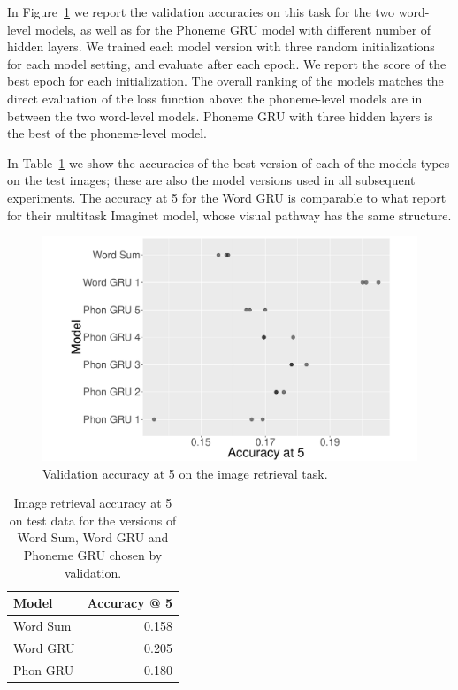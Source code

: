 In Figure~\ref{fig:accat5} we report the validation accuracies on this
task for the two word-level models, as well as for the Phoneme GRU
model with different number of hidden layers. We trained each model
version with three random initializations for each model setting, and
evaluate after each epoch. We report the score of the best epoch for
each initialization. 
The overall ranking of the models matches the direct
evaluation of the loss function above: the phoneme-level models are in
between the two word-level models. Phoneme GRU with three
hidden layers is the best of the phoneme-level model.

In Table~\ref{tab:accat5test} we show the accuracies of the best
version of each of the models types on the test images; these are also
the model versions used in all subsequent experiments. The accuracy at
5 for the {\sc Word GRU} is comparable to what
 report for their multitask {\sc Imaginet}
model, whose visual pathway has the same structure.


\begin{figure}
  \centering
  \includegraphics[scale=0.25]{accat5.pdf}
  \caption{Validation accuracy at 5 on the image retrieval task.}
  \label{fig:accat5}
\end{figure}


\begin{table}
  \centering
  \begin{tabular}{l|r}
    Model & Accuracy @ 5 \\\hline
    {\sc Word Sum} & 0.158 \\
    {\sc Word GRU} & 0.205 \\
    {\sc Phon GRU} & 0.180 \\
  \end{tabular}
  \caption{Image retrieval accuracy at 5 on test data for the versions of {\sc Word
      Sum}, {\sc Word GRU} and {\sc Phoneme GRU} chosen by
    validation.}
  \label{tab:accat5test}
\end{table}

